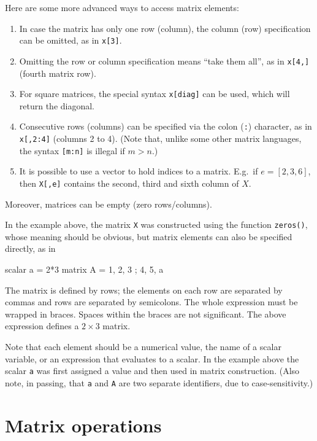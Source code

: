 Here are some more advanced ways to access matrix elements:
\begin{enumerate}
\item In case the matrix has only one row (column), the column (row)
  specification can be omitted, as in \texttt{x[3]}.
\item Omitting the row or column specification means ``take them
  all'', as in \texttt{x[4,]} (fourth matrix row).
\item For square matrices, the special syntax \texttt{x[diag]} can be
  used, which will return the diagonal.
\item Consecutive rows (columns) can be specified via the colon
  (\texttt{:}) character, as in \texttt{x[,2:4]} (columns 2 to 4).
  (Note that, unlike some other matrix languages, the syntax
  \texttt{[m:n]} is illegal if $m>n$.)
\item It is possible to use a vector to hold indices to a matrix. E.g.\
  if $e = [2,3,6]$, then \texttt{X[,e]} contains the second, third and
  sixth column of $X$.
\end{enumerate}
Moreover, matrices can be empty (zero rows/columns). 

In the example above, the matrix \texttt{X} was constructed using
the function \texttt{zeros()}, whose meaning should be obvious, but
matrix elements can also be specified directly, as in
\begin{code}
scalar a = 2*3
matrix A = { 1, 2, 3 ; 4, 5, a }
\end{code}
The matrix is defined by rows; the elements on each row are separated
by commas and rows are separated by semicolons.  The whole expression
must be wrapped in braces.  Spaces within the braces are not
significant. The above expression defines a $2\times3$ matrix.

Note that each element should be a numerical value, the name of a
scalar variable, or an expression that evaluates to a scalar. In the
example above the scalar \texttt{a} was first assigned a value and
then used in matrix construction. (Also note, in passing, that
\texttt{a} and \texttt{A} are two separate identifiers, due to
case-sensitivity.)

\section{Matrix operations}
\label{sec:mat-op}


